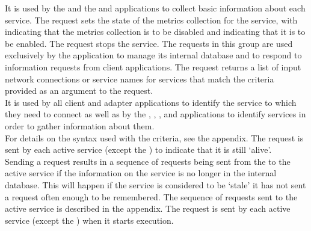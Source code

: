 It is used by the  and the
 and \emph{\MMMU} applications to collect basic information
about each service.
The  request sets the state of the metrics
collection for the service, with  indicating that the metrics collection is
to be disabled and  indicating that it is to be enabled.
The  request stops the service.
\secondaryEnd
{}
The requests in this group are used exclusively by the
 application to manage its internal database and to
respond to information requests from client applications.
The  request returns a list of input \yarp{}
network connections or service names for services that match the criteria provided as an
argument to the request.\\

It is used by all client and adapter applications to identify the service to which they
need to connect as well as by the ,
, ,
 and \emph{\MMMU} applications to identify services in
order to gather information about them.\\

For details on the syntax used with the criteria, see the 
 appendix.
The  request is sent by each active service
(except the ) to indicate that it is still `alive'.\\

Sending a  request results in a sequence of
requests being sent from the  to the active service if
the information on the service is no longer in the internal database.
This will happen if the service is considered to be `stale' \longDash{} it has not sent a
 request often enough to be remembered.
The sequence of requests sent to the active service is described in the 
 appendix.
The  request is sent by each active service
(except the ) when it starts execution.\\

